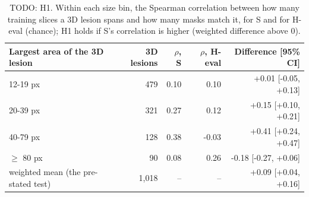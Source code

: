 \begin{table}
\centering
\small
\begin{tabular}{lrrrr}
\toprule
Largest area of the 3D lesion & 3D lesions & $\rho$, S & $\rho$, H-eval & Difference [95\% CI] \\
\midrule
12-19 px & 479 & 0.10 & 0.10 & +0.01 [-0.05, +0.13] \\
20-39 px & 321 & 0.27 & 0.12 & +0.15 [+0.10, +0.21] \\
40-79 px & 128 & 0.38 & -0.03 & +0.41 [+0.24, +0.47] \\
$\geq$ 80 px & 90 & 0.08 & 0.26 & -0.18 [-0.27, +0.06] \\
weighted mean (the pre-stated test) & 1,018 & -- & -- & +0.09 [+0.04, +0.16] \\
\bottomrule
\end{tabular}
\caption{TODO: H1. Within each size bin, the Spearman correlation between how many training slices a 3D lesion spans and how many masks match it, for S and for H-eval (chance); H1 holds if S's correlation is higher (weighted difference above 0).}
\label{tab:h1_h3}
\end{table}
